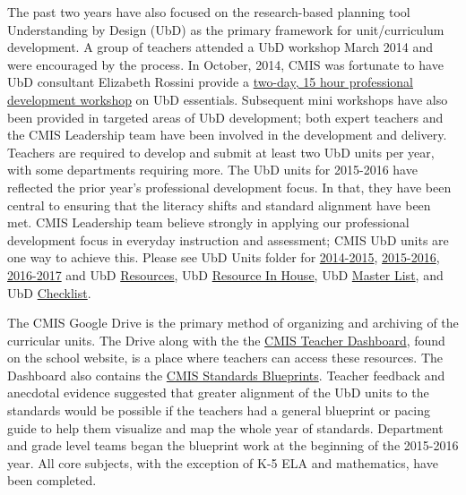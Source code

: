 \documentclass{report}
\begin{document}
\begin{findings}
The past two years have also focused on the research-based planning tool Understanding by Design (UbD) as the primary framework for unit/curriculum development. A group of teachers attended a UbD workshop March 2014 and were encouraged by the process. In October, 2014, CMIS was fortunate to have UbD consultant Elizabeth Rossini provide a \href{https://drive.google.com/drive/folders/0ByVFfrm0zfolbDlqWjhobkhDZkk?usp=sharing}{two-day, 15 hour professional development workshop} on UbD essentials. Subsequent mini workshops have also been provided in targeted areas of UbD development; both expert teachers and the CMIS Leadership team have been involved in the development and delivery. Teachers are required to develop and submit at least two UbD units per year, with some departments requiring more. The UbD units for 2015-2016 have reflected the prior year’s professional development focus. In that, they have been central to ensuring that the literacy shifts and standard alignment have been met. CMIS Leadership team believe strongly in applying our professional development focus in everyday instruction and assessment; CMIS UbD units are one way to achieve this. Please see UbD Units folder for \href{https://drive.google.com/drive/folders/0ByVFfrm0zfolQkFTQjNQMDhBN1E?usp=sharing}{2014-2015}, \href{https://drive.google.com/drive/folders/0ByVFfrm0zfolfl9RaFBtSy1YLVM2LUJONGNVcDAxbTZIWTNKTXVFZnh6eEUybjIwQi1RR3M?usp=sharing}{2015-2016}, \href{https://drive.google.com/drive/folders/0ByVFfrm0zfolak8xTjQ3NVhCbmc?usp=sharing}{2016-2017} and UbD \href{https://drive.google.com/a/cmis.ac.th/folderview?id=0ByVFfrm0zfolfmUyZV9DbGoxZVhpVHpGdG9MeEt6MHZJaEtoT3VzTjM0bkk5NFQ5MVJldUU&usp=sharing}{Resources}, UbD \href{https://drive.google.com/drive/folders/0ByVFfrm0zfolcXpjOUJTSmdIT1k?usp=sharing}{Resource In House}, UbD \href{https://docs.google.com/a/cmis.ac.th/document/d/1kL1VjwfuMMa7NaWmwUrEah1BM-jJRmLAd4VJzR3HoPs/edit?usp=sharing}{Master List}, and UbD \href{https://docs.google.com/a/cmis.ac.th/document/d/11IXUy-YcnFG8dMzr42iBigOuh1GmLVjcu_Ulv19r9Yg/edit?usp=sharing}{Checklist}. 

The CMIS Google Drive is the primary method of organizing and archiving  of the curricular units. The Drive along with the the \href{http://www.cmis.ac.th/}{CMIS Teacher Dashboard}, found on the school website, is a place where teachers can access these resources. The Dashboard also contains the \href{https://drive.google.com/drive/folders/0ByVFfrm0zfolfmV1QTNuWFdUVHV3dDVrRFMzUFBMazY0VGs1eWc0cmFjVGcwNDdsQkdrZzA?usp=sharing}{CMIS Standards Blueprints}. Teacher feedback and anecdotal evidence suggested that greater alignment of the UbD units to the standards would be possible if the teachers had a general blueprint or pacing guide to help them visualize and map the whole year of standards. Department and grade level teams began the blueprint work at the beginning of the 2015-2016 year. All core subjects, with the exception of K-5 ELA and mathematics, have been completed. 


\end{findings}
\end{document}
